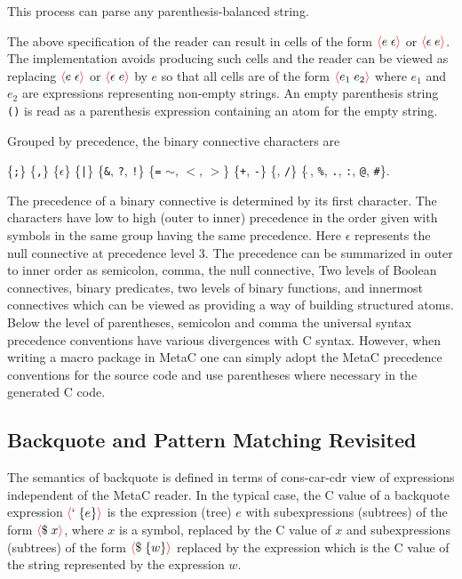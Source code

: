 \documentclass{article}
\newcommand{\mtt}[1]{\mbox{\tt #1}}
\newcommand{\fopen}{{\color{red} \langle}}
\newcommand{\fclose}{{\color{red} \rangle}}
\begin{document}
\noindent This process can parse any parenthesis-balanced string.

The above specification of the reader can result in cells of the form $\fopen e\;\epsilon \fclose$ or $\fopen \epsilon \;e\fclose$.   The implementation avoids producing such cells
and the reader can be viewed as replacing $\fopen e\;\epsilon \fclose$ or $\fopen \epsilon \;e\fclose$ by $e$ so that
all cells are of the form $\fopen e_1\;e_2\fclose$ where $e_1$ and $e_2$ are expressions representing non-empty strings.  An empty parenthesis string {\tt ()}
is read as a parenthesis expression containing an atom for the empty string.

\noindent Grouped by precedence, the binary connective characters are

\medskip
\centerline{\{\mtt{;}\} \{\mtt{,}\}  \{$\epsilon$\}
  \{\mtt{|}\} \{{\tt \&}, {\tt ?}, {\tt !}\} \{{\tt =} {\tt $\sim$}, {\tt $<$}, {\tt $>$}\} \{{\tt +}, {\tt -}\} \{{\tt *}, {\tt /}\} \{$\hat{~}$, {\tt \%}, {\tt .}, \mtt{:},  {\tt @}, {\tt \#}\}.}

\noindent The precedence of a binary connective is determined by its first character.  The characters have low to high (outer to inner) precedence in the order given with symbols
in the same group having the same precedence.  Here $\epsilon$ represents the null connective at precedence level 3.
The precedence can be summarized in outer to inner order as semicolon, comma, the null connective,
Two levels of Boolean connectives, binary predicates,
two levels of binary functions, and innermost connectives which can be viewed as providing a way of building structured atoms.  Below the level of parentheses, semicolon and comma the universal syntax precedence
conventions have various divergences with C syntax.  However, when writing a macro package in MetaC one can simply adopt the MetaC precedence conventions for the
source code and use parentheses where necessary in the generated C code.

\subsection{Backquote and Pattern Matching Revisited}

The semantics of backquote is defined in terms of cons-car-cdr view of expressions independent of the MetaC reader.
In the typical case, the C value of a backquote expression
$\fopen ` \;\{e\}\fclose$ is the expression (tree) $e$ with subexpressions (subtrees) of the form $\fopen \$\;x \fclose$, where $x$ is a symbol,
replaced by the C value of $x$
and subexpressions (subtrees) of the form $\fopen \$\;\{w\}\fclose$ replaced by the expression which is the C value of the string represented by the expression $w$.
\end{document}
